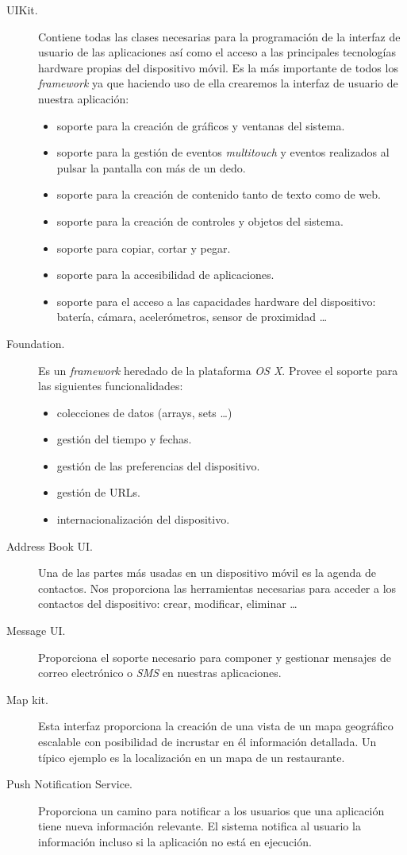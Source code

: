  \begin{description}
 	\item [UIKit.] Contiene todas las clases necesarias para la programación de la interfaz de usuario de las aplicaciones así como el acceso a las principales tecnologías hardware 
	 propias del dispositivo  móvil. Es la más importante de todos los \emph{framework} ya que haciendo uso de ella crearemos la interfaz de usuario de nuestra aplicación:
		 \begin{itemize}
		  	\item soporte para la creación de gráficos y ventanas del sistema.
			\item soporte para la gestión de eventos \emph{multitouch} y eventos realizados al pulsar la pantalla con más de un dedo.
			 \item soporte para la creación de contenido tanto de texto como de web.
 			\item soporte para la creación de controles y objetos del sistema.
 			\item soporte para copiar, cortar y pegar.
 			\item soporte para la accesibilidad de aplicaciones.
 			\item soporte para el acceso a las capacidades hardware del dispositivo: batería, cámara, acelerómetros, sensor de proximidad \ldots 
 		\end{itemize}
 	 \item [Foundation.] Es un \emph{framework} heredado de la plataforma \emph{OS X}. Provee el soporte para las siguientes funcionalidades: 
 		\begin{itemize}
			\item colecciones de datos (arrays, sets \ldots)
			\item gestión del tiempo y fechas.
			\item gestión de las preferencias del dispositivo.
			\item gestión de URLs.
			\item internacionalización del dispositivo.
		\end{itemize}
	\item [Address Book UI.] Una de las partes más usadas en un dispositivo móvil es la agenda de contactos. Nos proporciona las herramientas necesarias para acceder a los contactos del dispositivo: crear, modificar, eliminar \dots
	\item [Message UI.] Proporciona el soporte necesario para componer y gestionar mensajes de correo electrónico o \emph{SMS} en nuestras aplicaciones.
	\item [Map kit.]  Esta interfaz proporciona la creación de una vista de un mapa geográfico escalable con posibilidad de incrustar en él información detallada. Un típico ejemplo es la localización en un mapa de un restaurante.
	\item [Push Notification Service.] Proporciona un camino para notificar a los usuarios que una aplicación tiene nueva información relevante. El sistema notifica al usuario la información incluso si la aplicación no está en ejecución.

\end{description}

